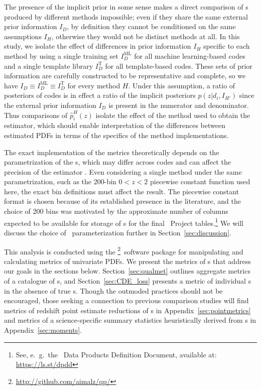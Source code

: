 The presence of the implicit prior in some sense makes a direct comparison of \pzpdf s produced by different methods impossible; even if they share the same external prior information $I_{D}$, by definition they cannot be conditioned on the same assumptions $I_{H}$, otherwise they would not be distinct methods at all.
In this study, we isolate the effect of differences in prior information $I_{H}$ specific to each method by using a single training set $I_{D}^{\mathrm{ML}}$ for all machine learning-based codes and a single template library $I_{D}^{\mathrm{T}}$ for all template-based codes.
These sets of prior information are carefully constructed to be representative and complete, so we have $I_{D} \equiv I_{D}^{\mathrm{ML}} \equiv I_{D}^{\mathrm{T}}$ for every method $H$.
Under this assumption, a ratio of posteriors of codes is in effect a ratio of the implicit posteriors $p(z \vert d_{i}, I_{H'})$ since the external prior information $I_{D}$ is present in the numerator and denominator.
Thus comparisons of $\hat{p}_{i}^{H}(z)$ isolate the effect of the method used to obtain the estimator, which should enable interpretation of the differences between estimated PDFs in terms of the specifics of the method implementations.

The exact implementation of the metrics theoretically depends on the parametrization of the \pzpdf s, which may differ across codes and can affect the precision of the estimator \citep{Malz:2018}.
Even considering a single method under the same parametrization, such as the 200-bin $0 < z < 2$ piecewise constant function used here, the exact bin definitions must affect the result.
The piecewise constant format is chosen because of its established presence in the literature, and the choice of 200 bins was motivated by the approximate number of columns expected to be available for storage of \pzpdf s for the final \lsst\ Project tables.\footnote{See, e.~g.~the \lsst\ Data Products Definition Document, available at: \url{https://ls.st/dpdd}}
We will discuss the choice of \pzpdf\ parameterization further in Section~\ref{sec:discussion}.

This analysis is conducted using the \qp\footnote{\url{http://github.com/aimalz/qp/}}\ software package \citep{Malz:qp} for manipulating and calculating metrics of univariate PDFs.
We present the metrics of \pzpdf s that address our goals in the sections below.
Section~\ref{sec:qualmet} outlines aggregate metrics of a catalogue of \pzpdf s, and Section~\ref{sec:CDE_loss} presents a metric of individual \pzpdf s in the absence of true \pzpdf s.
Though the outmoded practices should not be encouraged, those seeking a connection to previous comparison studies will find metrics of redshift point estimate reductions of \pzpdf s in Appendix~\ref{sec:pointmetrics} and metrics of a science-specific summary statistics heuristically derived from \pzpdf s in Appendix~\ref{sec:moments}.

